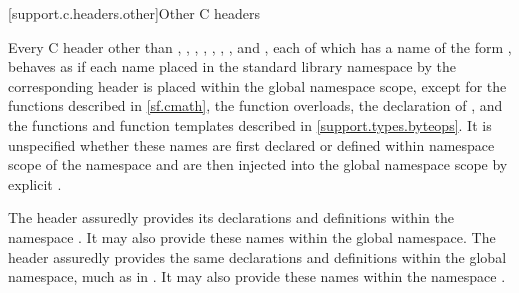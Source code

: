 [support.c.headers.other]{Other C headers}

\pnum
Every C header
other than
,
,
,\newline
{},
,
,
, and\newline
{},
each of
which has a name of the form
%
,
behaves as if each name placed in the standard library namespace by
the corresponding
header is placed within
the global namespace scope,
except for the functions described in \ref{sf.cmath},
the  function overloads,
the declaration of , and
the functions and function templates described in \ref{support.types.byteops}.
It is unspecified whether these names are first declared or defined within
namespace scope of the namespace
 and are then injected into the global namespace scope by
explicit .

\pnum
\begin{example}
The header  assuredly
provides its declarations and definitions within the namespace
. It may also provide these names within the
global namespace.
The header 
assuredly provides the same declarations and definitions within
the global namespace,
much as in \IsoCUndated{}. It may also provide these names within
the namespace .
\end{example}
